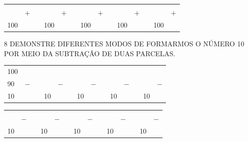 \vspace{2cm}

\begin{center}
\begin{tabular}{llllllllllllll}
\mbox{} &  &  & \mbox{} &  &  & \mbox{} &  &  & \mbox{} &  &  & \mbox{} &  \\
\mbox{} & $+$ &  & \mbox{} & $+$ &  & \mbox{} & $+$ &  & \mbox{} & $+$ &  & \mbox{} & $+$ \\ \cline{1-1} \cline{4-4} \cline{7-7} \cline{10-10} \cline{13-13}
100 &  &  & 100 &  &  & 100 &  &  & 100 &  &  & 100 & 
\end{tabular}
\end{center}

\vspace{2cm}


\num{8} DEMONSTRE DIFERENTES MODOS DE FORMARMOS O NÚMERO 10 POR MEIO DA SUBTRAÇÃO DE
DUAS PARCELAS.

\vspace{2cm}

\begin{center}
\begin{tabular}{llllllllllllll}
100 &  &  & \mbox{} &  &  & \mbox{} &  &  & \mbox{} &  &  & \mbox{} &  \\
90 & $-$ &  & \mbox{} & $-$ &  & \mbox{} & $-$ &  & \mbox{} & $-$ &  & \mbox{} & $-$ \\ \cline{1-1} \cline{4-4} \cline{7-7} \cline{10-10} \cline{13-13}
10 &  &  & 10 &  &  & 10 &  &  & 10 &  &  & 10 & 
\end{tabular}
\end{center}

\vspace{2cm}

\begin{center}
\begin{tabular}{llllllllllllll}
\mbox{} &  &  & \mbox{} &  &  & \mbox{} &  &  & \mbox{} &  &  & \mbox{} &  \\
\mbox{} & $-$ &  & \mbox{} & $-$ &  & \mbox{} & $-$ &  & \mbox{} & $-$ &  & \mbox{} & $-$ \\ \cline{1-1} \cline{4-4} \cline{7-7} \cline{10-10} \cline{13-13}
10 &  &  & 10 &  &  & 10 &  &  & 10 &  &  & 10 & 
\end{tabular}
\end{center}

